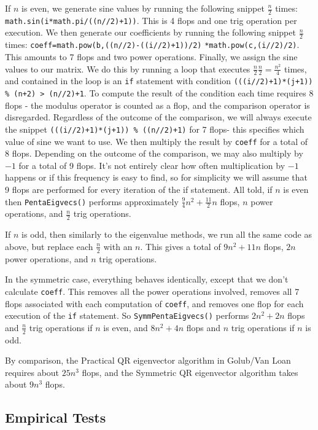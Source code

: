 \documentclass[10pt,twocolumn]{article}
\begin{document}
If $n$ is even, we generate sine values by running the following snippet $\frac{n}{2}$ times:
\verb|math.sin(i*math.pi/((n//2)+1))|. This is 4 flops and one trig operation per execution. We then generate our coefficients by running the following snippet $\frac{n}{2}$ times: \verb|coeff=math.pow(b,((n//2)-((i//2)+1))/2)| \verb|*math.pow(c,(i//2)/2)|. This amounts to 7 flops and two power operations. Finally, we assign the sine values to our matrix. We do this by running a loop that executes $\frac{n}{2}\frac{n}{2}=\frac{n^2}{4}$ times, and contained in the loop is an \verb|if| statement with condition \verb|(((i//2)+1)*(j+1)) % (n+2) > (n//2)+1|. To compute the result of the condition each time requires 8 flops - the modulus operator is counted as a flop, and the comparison operator is disregarded. Regardless of the outcome of the comparison, we will always execute the snippet \verb|(((i//2)+1)*(j+1)) % ((n//2)+1)| for 7 flops- this specifies which value of sine we want to use. We then multiply the result by \verb|coeff| for a total of 8 flops. Depending on the outcome of the comparison, we may also multiply by $-1$ for a total of 9 flops. It's not entirely clear how often multiplication by $-1$ happens or if this frequency is easy to find, so for simplicity we will assume that 9 flops are performed for every iteration of the if statement. All told, if $n$ is even then \verb|PentaEigvecs()| performs approximately $\frac{9}{4}n^2+\frac{11}{2}n$ flops, $n$ power operations, and $\frac{n}{2}$ trig operations.

If $n$ is odd, then similarly to the eigenvalue methods, we run all the same code as above, but replace each $\frac{n}{2}$ with an $n$. This gives a total of $9n^2+11n$ flops, $2n$ power operations, and $n$ trig operations.

In the symmetric case, everything behaves identically, except that we don't calculate \verb|coeff|. This removes all the power operations involved, removes all 7 flops associated with each computation of \verb|coeff|, and removes one flop for each execution of the \verb|if| statement. So \verb|SymmPentaEigvecs()| performs $2n^2+2n$ flops and $\frac{n}{2}$ trig operations if $n$ is even, and $8n^2+4n$ flops and $n$ trig operations if $n$ is odd.

By comparison, the Practical QR eigenvector algorithm in Golub/Van Loan requires about $25n^3$ flops, and the Symmetric QR eigenvector algorithm takes about $9n^3$ flops.

\subsection{Empirical Tests}
\end{document}
